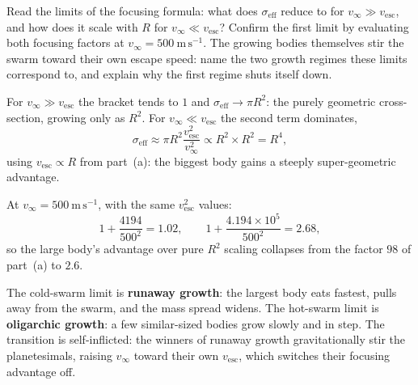 \parti Read the limits of the focusing formula: what does $\sigma_{\mathrm{eff}}$ reduce to for
$v_\infty \gg v_{\mathrm{esc}}$, and how does it scale with $R$ for
$v_\infty \ll v_{\mathrm{esc}}$? Confirm the first limit by evaluating both focusing factors at
$v_\infty = 500\ \mathrm{m\,s^{-1}}$. The growing bodies themselves stir the swarm toward their
own escape speed: name the two growth regimes these limits correspond to, and explain why the
first regime shuts itself down.

\begin{solution}
For $v_\infty \gg v_{\mathrm{esc}}$ the bracket tends to $1$ and
$\sigma_{\mathrm{eff}} \to \pi R^2$: the purely geometric cross-section, growing only as $R^2$.
For $v_\infty \ll v_{\mathrm{esc}}$ the second term dominates,
\[
  \sigma_{\mathrm{eff}} \approx \pi R^2 \frac{v_{\mathrm{esc}}^2}{v_\infty^2}
    \propto R^2 \times R^2 = R^4,
\]
using $v_{\mathrm{esc}} \propto R$ from part~(a): the biggest body gains a steeply
super-geometric advantage.

At $v_\infty = 500\ \mathrm{m\,s^{-1}}$, with the same $v_{\mathrm{esc}}^2$ values:
\[
  1 + \frac{4194}{500^2} = 1.02,
  \qquad
  1 + \frac{4.194 \times 10^{5}}{500^2} = 2.68,
\]
so the large body's advantage over pure $R^2$ scaling collapses from the factor $98$ of part~(a)
to $2.6$.

The cold-swarm limit is \textbf{runaway growth}: the largest body eats fastest, pulls away from
the swarm, and the mass spread widens. The hot-swarm limit is \textbf{oligarchic growth}: a few
similar-sized bodies grow slowly and in step. The transition is self-inflicted: the winners of
runaway growth gravitationally stir the planetesimals, raising $v_\infty$ toward their own
$v_{\mathrm{esc}}$, which switches their focusing advantage off.
\end{solution}
